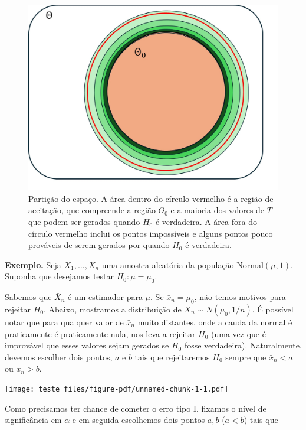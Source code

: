 \documentclass[
  letterpaper,
  DIV=11,
  numbers=noendperiod]{scrartcl}
\begin{document}
\begin{figure}

{\centering \includegraphics{fig_testE.jpg}

}

\caption{Partição do espaço. A área dentro do círculo vermelho é a
região de aceitação, que compreende a região \(\Theta_0\) e a maioria
dos valores de \(T\) que podem ser gerados quando \(H_0\) é verdadeira.
A área fora do círculo vermelho inclui os pontos impossíveis e alguns
pontos pouco prováveis de serem gerados por quando \(H_0\) é
verdadeira.}

\end{figure}%

\textbf{Exemplo.} Seja \(X_1,\ldots,X_{n}\) uma amostra aleatória da
população Normal\((\mu,1)\). Suponha que desejamos testar
\(H_0:\mu=\mu_0\).

Sabemos que \(\bar{X}_{n}\) é um estimador para \(\mu\). Se
\(\bar{x}_{n}=\mu_0\), não temos motivos para rejeitar \(H_0\). Abaixo,
mostramos a distribuição de \(\bar{X}_{n}\sim N(\mu_0,1/n)\). É possível
notar que para qualquer valor de \(\bar{x}_{n}\) muito distantes, onde a
cauda da normal é praticamente é praticamente nula, nos leva a rejeitar
\(H_0\) (uma vez que é improvável que esses valores sejam gerados se
\(H_0\) fosse verdadeira). Naturalmente, devemos escolher dois pontos,
\(a\) e \(b\) tais que rejeitaremos \(H_0\) sempre que \(\bar{x}_{n}<a\)
ou \(\bar{x}_n>b\).

\texttt{[image: teste\_files/figure-pdf/unnamed-chunk-1-1.pdf]}

Como precisamos ter chance de cometer o erro tipo I, fixamos o nível de
significância em \(\alpha\) e em seguida escolhemos dois pontos \(a,b\)
(\(a<b\)) tais que
\end{document}
